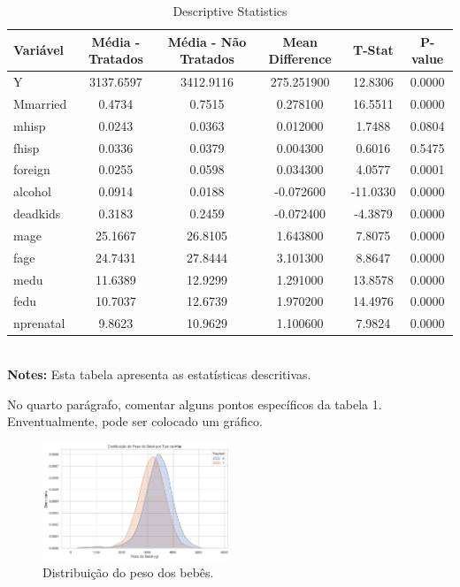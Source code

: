 \documentclass[a4paper]{article}
\begin{document}
\begin{table}[h]
\centering
\caption{Descriptive Statistics}
\begin{tabular}{lccccc}
      \toprule
      Variável & Média - Tratados & Média - Não Tratados & Mean Difference & T-Stat & P-value \\
      \midrule
      Y & 3137.6597 & 3412.9116 & 275.251900 & 12.8306 & 0.0000 \\
      Mmarried & 0.4734 & 0.7515 & 0.278100 & 16.5511 & 0.0000 \\
      mhisp & 0.0243 & 0.0363 & 0.012000 & 1.7488 & 0.0804 \\
      fhisp & 0.0336 & 0.0379 & 0.004300 & 0.6016 & 0.5475 \\
      foreign & 0.0255 & 0.0598 & 0.034300 & 4.0577 & 0.0001 \\
      alcohol & 0.0914 & 0.0188 & -0.072600 & -11.0330 & 0.0000 \\
      deadkids & 0.3183 & 0.2459 & -0.072400 & -4.3879 & 0.0000 \\
      mage & 25.1667 & 26.8105 & 1.643800 & 7.8075 & 0.0000 \\
      fage & 24.7431 & 27.8444 & 3.101300 & 8.8647 & 0.0000 \\
      medu & 11.6389 & 12.9299 & 1.291000 & 13.8578 & 0.0000 \\
      fedu & 10.7037 & 12.6739 & 1.970200 & 14.4976 & 0.0000 \\
      nprenatal & 9.8623 & 10.9629 & 1.100600 & 7.9824 & 0.0000 \\
      \bottomrule
\end{tabular} \\
\textbf{Notes:} Esta tabela apresenta as estatísticas descritivas.
\end{table}

No quarto parágrafo, comentar alguns pontos específicos da tabela 1. Enventualmente, pode ser colocado um gráfico.


\begin{figure}
      \centering
      \includegraphics[width=0.5\textwidth]{Fig.png}
      \caption{\label{fig:Distribution} Distribuição do peso dos bebês.}
      \end{figure}
\end{document}
